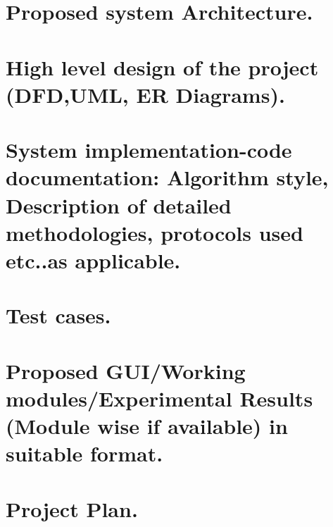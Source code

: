 \documentclass[12pt]{article}
\begin{document}
\section{\large{Proposed system Architecture.}}

\section{\large{High level design of the project (DFD,UML, ER Diagrams).}}

\section{\large{System implementation-code documentation: Algorithm style, Description of detailed methodologies,  protocols used etc..as applicable.}}

\section{\large{Test cases.}}

\section{\large{Proposed GUI/Working modules/Experimental Results (Module wise if available) in suitable format.}}

\section{\large{Project Plan.}}
\end{document}
